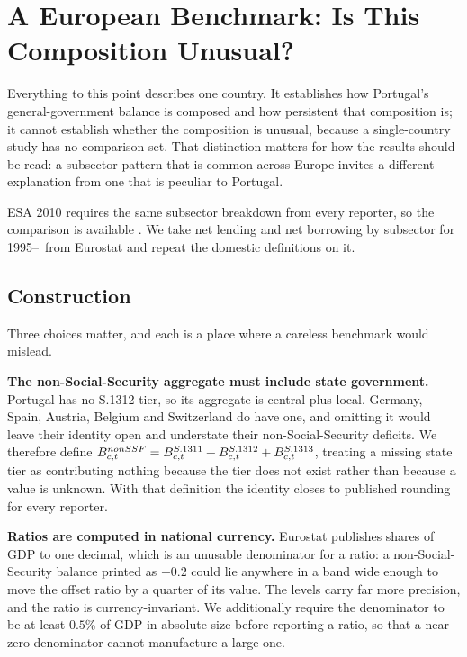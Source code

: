 
\section{A European Benchmark: Is This Composition Unusual?}
\label{sec:benchmark}

Everything to this point describes one country. It establishes how Portugal's
general-government balance is composed and how persistent that composition is; it
cannot establish whether the composition is unusual, because a single-country study
has no comparison set. That distinction matters for how the results should be read:
a subsector pattern that is common across Europe invites a different explanation from
one that is peculiar to Portugal.

ESA 2010 requires the same subsector breakdown from every reporter, so the comparison
is available \citep{eurostat_gov_main,ecb_gfs}. We take net lending and net borrowing
by subsector for 1995--\PanelEnd\ from Eurostat and repeat the domestic definitions on
it.

\subsection{Construction}

Three choices matter, and each is a place where a careless benchmark would mislead.

\textbf{The non-Social-Security aggregate must include state government.} Portugal has
no S.1312 tier, so its aggregate is central plus local. Germany, Spain, Austria,
Belgium and Switzerland do have one, and omitting it would leave their identity open
and understate their non-Social-Security deficits. We therefore define
$B^{nonSSF}_{c,t} = B^{S.1311}_{c,t} + B^{S.1312}_{c,t} + B^{S.1313}_{c,t}$, treating a
missing state tier as contributing nothing because the tier does not exist rather than
because a value is unknown. With that definition the identity closes to published
rounding for every reporter.

\textbf{Ratios are computed in national currency.} Eurostat publishes shares of GDP to
one decimal, which is an unusable denominator for a ratio: a non-Social-Security
balance printed as $-0.2$ could lie anywhere in a band wide enough to move the offset
ratio by a quarter of its value. The levels carry far more precision, and the ratio is
currency-invariant. We additionally require the denominator to be at least $0.5$\% of
GDP in absolute size before reporting a ratio, so that a near-zero denominator cannot
manufacture a large one.

